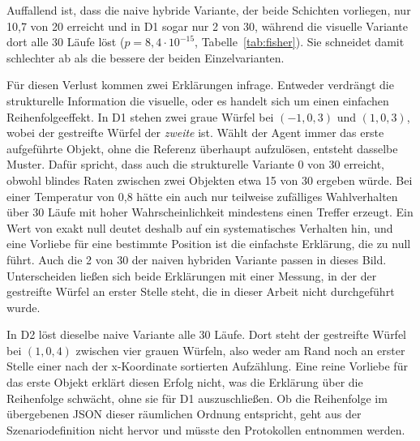 Auffallend ist, dass die naive hybride Variante, der beide Schichten vorliegen, nur 10,7 von 20 erreicht und in D1 sogar nur 2 von 30, während die visuelle Variante dort alle 30 Läufe löst ($p = 8{,}4\cdot10^{-15}$, Tabelle~\ref{tab:fisher}).
Sie schneidet damit schlechter ab als die bessere der beiden Einzelvarianten.

Für diesen Verlust kommen zwei Erklärungen infrage.
Entweder verdrängt die strukturelle Information die visuelle, oder es handelt sich um einen einfachen Reihenfolgeeffekt.
In D1 stehen zwei graue Würfel bei $(-1,0,3)$ und $(1,0,3)$, wobei der gestreifte Würfel der \emph{zweite} ist.
Wählt der Agent immer das erste aufgeführte Objekt, ohne die Referenz überhaupt aufzulösen, entsteht dasselbe Muster.
Dafür spricht, dass auch die strukturelle Variante 0 von 30 erreicht, obwohl blindes Raten zwischen zwei Objekten etwa 15 von 30 ergeben würde.
Bei einer Temperatur von 0{,}8 hätte ein auch nur teilweise zufälliges Wahlverhalten über 30 Läufe mit hoher Wahrscheinlichkeit mindestens einen Treffer erzeugt.
Ein Wert von exakt null deutet deshalb auf ein systematisches Verhalten hin, und eine Vorliebe für eine bestimmte Position ist die einfachste Erklärung, die zu null führt.
Auch die 2 von 30 der naiven hybriden Variante passen in dieses Bild.
Unterscheiden ließen sich beide Erklärungen mit einer Messung, in der der gestreifte Würfel an erster Stelle steht, die in dieser Arbeit nicht durchgeführt wurde.


In D2 löst dieselbe naive Variante alle 30 Läufe.
Dort steht der gestreifte Würfel bei $(1,0,4)$ zwischen vier grauen Würfeln, also weder am Rand noch an erster Stelle einer nach der x-Koordinate sortierten Aufzählung.
Eine reine Vorliebe für das erste Objekt erklärt diesen Erfolg nicht, was die Erklärung über die Reihenfolge schwächt, ohne sie für D1 auszuschließen.
Ob die Reihenfolge im übergebenen JSON dieser räumlichen Ordnung entspricht, geht aus der Szenariodefinition nicht hervor und müsste den Protokollen entnommen werden.

